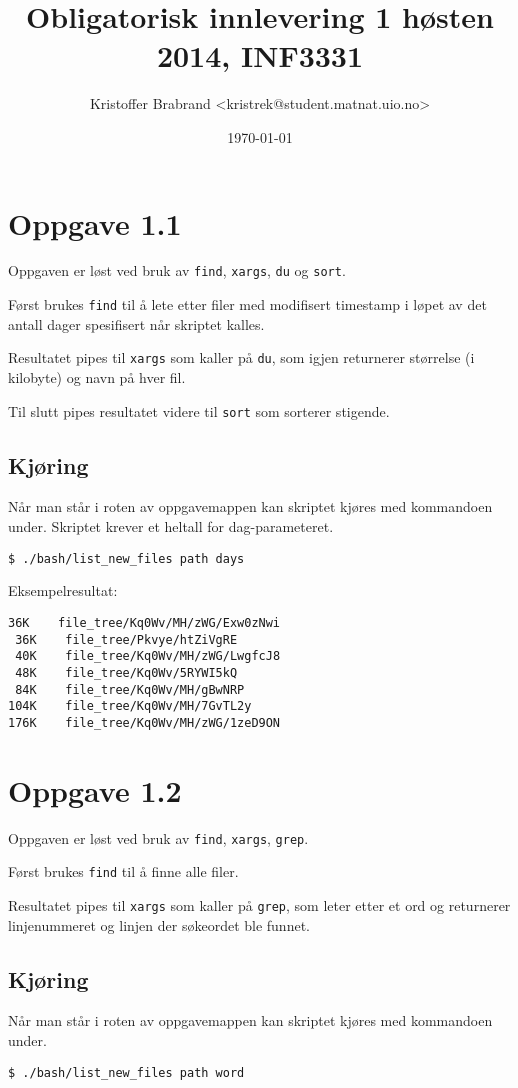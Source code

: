 \documentclass{article}
\title{Obligatorisk innlevering 1 høsten 2014, INF3331}
\author{Kristoffer Brabrand <kristrek@student.matnat.uio.no>}
\date{\today}
\begin{document}
\maketitle

\section*{Oppgave 1.1}

Oppgaven er løst ved bruk av \verb;find;, \verb;xargs;, \verb;du; og \verb;sort;.

Først brukes \verb;find; til å lete etter filer med modifisert timestamp i løpet av  det antall dager spesifisert når skriptet kalles.

Resultatet pipes til \verb;xargs; som kaller på \verb;du;, som igjen returnerer størrelse (i kilobyte) og navn på hver fil.

Til slutt pipes resultatet videre til \verb;sort; som sorterer stigende.

\subsection*{Kjøring}
Når man står i roten av oppgavemappen kan skriptet kjøres med kommandoen under. Skriptet krever et heltall for dag-parameteret.
\begin{Verbatim}[fontsize=\small, frame=single]
$ ./bash/list_new_files path days
\end{Verbatim}

Eksempelresultat:
\begin{Verbatim}[fontsize=\small, frame=single]
 36K	file_tree/Kq0Wv/MH/zWG/Exw0zNwi
 36K	file_tree/Pkvye/htZiVgRE
 40K	file_tree/Kq0Wv/MH/zWG/LwgfcJ8
 48K	file_tree/Kq0Wv/5RYWI5kQ
 84K	file_tree/Kq0Wv/MH/gBwNRP
104K	file_tree/Kq0Wv/MH/7GvTL2y
176K	file_tree/Kq0Wv/MH/zWG/1zeD9ON
\end{Verbatim}

\section*{Oppgave 1.2}

Oppgaven er løst ved bruk av \verb;find;, \verb;xargs;, \verb;grep;.

Først brukes \verb;find; til å finne alle filer.

Resultatet pipes til \verb;xargs; som kaller på \verb;grep;, som leter etter et ord og returnerer linjenummeret og linjen der søkeordet ble funnet.

\subsection*{Kjøring}
Når man står i roten av oppgavemappen kan skriptet kjøres med kommandoen under.
\begin{Verbatim}[fontsize=\small, frame=single]
$ ./bash/list_new_files path word
\end{Verbatim}
\end{document}
